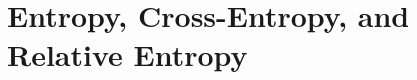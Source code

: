 \documentclass{article}
\begin{document}







\section{Entropy, Cross-Entropy, and Relative Entropy}
\end{document}

